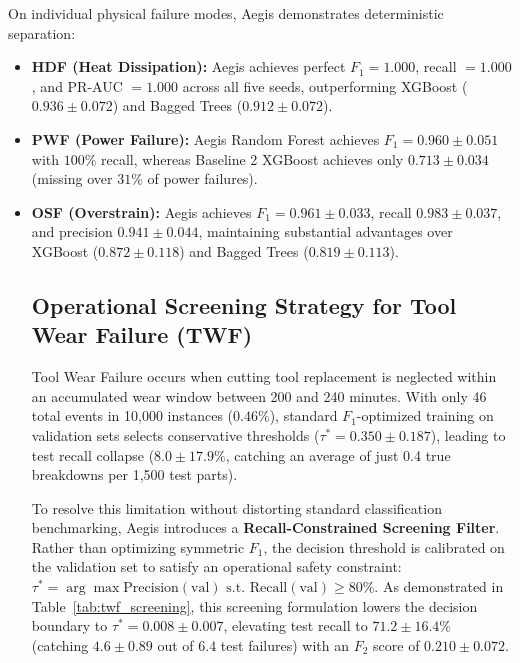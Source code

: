 \documentclass[conference]{IEEEtran}
\begin{document}
On individual physical failure modes, Aegis demonstrates deterministic separation:
\begin{itemize}
    \item \textbf{HDF (Heat Dissipation):} Aegis achieves perfect $F_1 = 1.000$, recall $= 1.000$, and PR-AUC $= 1.000$ across all five seeds, outperforming XGBoost ($0.936 \pm 0.072$) and Bagged Trees ($0.912 \pm 0.072$).
    \item \textbf{PWF (Power Failure):} Aegis Random Forest achieves $F_1 = 0.960 \pm 0.051$ with $100\%$ recall, whereas Baseline 2 XGBoost achieves only $0.713 \pm 0.034$ (missing over $31\%$ of power failures).
    \item \textbf{OSF (Overstrain):} Aegis achieves $F_1 = 0.961 \pm 0.033$, recall $0.983 \pm 0.037$, and precision $0.941 \pm 0.044$, maintaining substantial advantages over XGBoost ($0.872 \pm 0.118$) and Bagged Trees ($0.819 \pm 0.113$).

\subsection{Operational Screening Strategy for Tool Wear Failure (TWF)}
Tool Wear Failure occurs when cutting tool replacement is neglected within an accumulated wear window between 200 and 240 minutes. With only 46 total events in 10,000 instances ($0.46\%$), standard $F_1$-optimized training on validation sets selects conservative thresholds ($\tau^* = 0.350 \pm 0.187$), leading to test recall collapse ($8.0 \pm 17.9\%$, catching an average of just 0.4 true breakdowns per 1,500 test parts).

To resolve this limitation without distorting standard classification benchmarking, Aegis introduces a \textbf{Recall-Constrained Screening Filter}. Rather than optimizing symmetric $F_1$, the decision threshold is calibrated on the validation set to satisfy an operational safety constraint: $\tau^* = \arg\max \text{Precision}(\text{val}) \text{ s.t. } \text{Recall}(\text{val}) \ge 80\%$. As demonstrated in Table~\ref{tab:twf_screening}, this screening formulation lowers the decision boundary to $\tau^* = 0.008 \pm 0.007$, elevating test recall to $\mathbf{71.2 \pm 16.4\%}$ (catching $4.6 \pm 0.89$ out of $6.4$ test failures) with an $F_2$ score of $0.210 \pm 0.072$.


\end{itemize}
\end{document}
